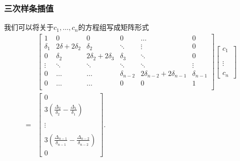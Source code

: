 \documentclass[10pt]{beamer}
\begin{document}
\begin{frame}
\frametitle{三次样条插值}
我们可以将关于$c_1 , \ldots, c_n$的方程组写成矩阵形式
\begin{align}
&\left[ \begin{array}{cccccc}
     1                 & 0                             & 0                                      & 0                    &\ldots                                               & 0                \\  
     \delta_1      & 2\delta + 2\delta_2 & \delta_2                            & \ddots             & \vdots                                            & 0                \\ 
     0                 & \delta_2                  & 2\delta_2 + 2\delta_3       & \delta_3          & \ddots                                            & 0                \\
      \vdots        & \ddots                     &  \ddots                               &  \ddots            & \ddots                                           & \vdots         \\
      0                & \ldots                      & \ldots                                 &  \delta_{n-2}   & 2 \delta_{n-2} + 2\delta_{n-1}       & \delta_{n-1} \\
      0                & \ldots                      & \ldots                                 &  0                    & 0                                                  & 1                  \\      
       \end{array} \right] 
\left[ \begin{array}{c} 
      c_{1} \\ \quad \\ \quad \\ \vdots \\ \quad \\ c_n \end{array} \right] \nonumber \\
=&
\left[ \begin{array}{c}
     0 \\ 3(\frac{\Delta_2}{\delta_2} - \frac{\Delta_1}{\delta_1}) \\ \quad \\ \vdots \\ \quad \\ 3(\frac{\Delta_{n-1}}{\delta_{n-1}} - \frac{\Delta_{n-2}}{\delta_{n-2}}) \\ 0 \end{array} \right].
\end{align}
\end{frame}
\end{document}
